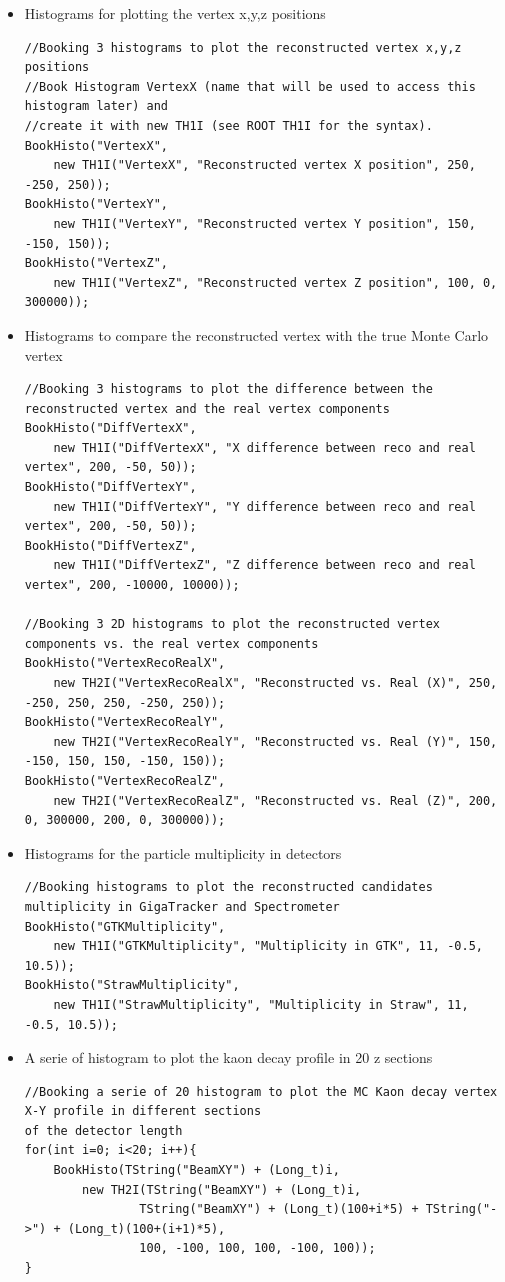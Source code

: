 \begin{itemize}
  \item Histograms for plotting the vertex x,y,z positions
\begin{lstlisting}
//Booking 3 histograms to plot the reconstructed vertex x,y,z positions
//Book Histogram VertexX (name that will be used to access this histogram later) and 
//create it with new TH1I (see ROOT TH1I for the syntax).
BookHisto("VertexX", 
	new TH1I("VertexX", "Reconstructed vertex X position", 250, -250, 250));
BookHisto("VertexY", 
	new TH1I("VertexY", "Reconstructed vertex Y position", 150, -150, 150));
BookHisto("VertexZ", 
	new TH1I("VertexZ", "Reconstructed vertex Z position", 100, 0, 300000));
\end{lstlisting}
	\item Histograms to compare the reconstructed vertex with the true Monte Carlo vertex
\begin{lstlisting}
//Booking 3 histograms to plot the difference between the reconstructed vertex and the real vertex components
BookHisto("DiffVertexX", 
	new TH1I("DiffVertexX", "X difference between reco and real vertex", 200, -50, 50));
BookHisto("DiffVertexY", 
	new TH1I("DiffVertexY", "Y difference between reco and real vertex", 200, -50, 50));
BookHisto("DiffVertexZ", 
	new TH1I("DiffVertexZ", "Z difference between reco and real vertex", 200, -10000, 10000));

//Booking 3 2D histograms to plot the reconstructed vertex components vs. the real vertex components
BookHisto("VertexRecoRealX", 
	new TH2I("VertexRecoRealX", "Reconstructed vs. Real (X)", 250, -250, 250, 250, -250, 250));
BookHisto("VertexRecoRealY", 
	new TH2I("VertexRecoRealY", "Reconstructed vs. Real (Y)", 150, -150, 150, 150, -150, 150));
BookHisto("VertexRecoRealZ", 
	new TH2I("VertexRecoRealZ", "Reconstructed vs. Real (Z)", 200, 0, 300000, 200, 0, 300000));
\end{lstlisting}
	\item Histograms for the particle multiplicity in detectors
\begin{lstlisting}
//Booking histograms to plot the reconstructed candidates multiplicity in GigaTracker and Spectrometer
BookHisto("GTKMultiplicity", 
	new TH1I("GTKMultiplicity", "Multiplicity in GTK", 11, -0.5, 10.5));
BookHisto("StrawMultiplicity", 
	new TH1I("StrawMultiplicity", "Multiplicity in Straw", 11, -0.5, 10.5));
\end{lstlisting}
	\item A serie of histogram to plot the kaon decay profile in 20 z sections
\begin{lstlisting}
//Booking a serie of 20 histogram to plot the MC Kaon decay vertex X-Y profile in different sections
of the detector length 
for(int i=0; i<20; i++){
	BookHisto(TString("BeamXY") + (Long_t)i, 
		new TH2I(TString("BeamXY") + (Long_t)i,
				TString("BeamXY") + (Long_t)(100+i*5) + TString("->") + (Long_t)(100+(i+1)*5),
				100, -100, 100, 100, -100, 100));
}
\end{lstlisting}
\end{itemize}

